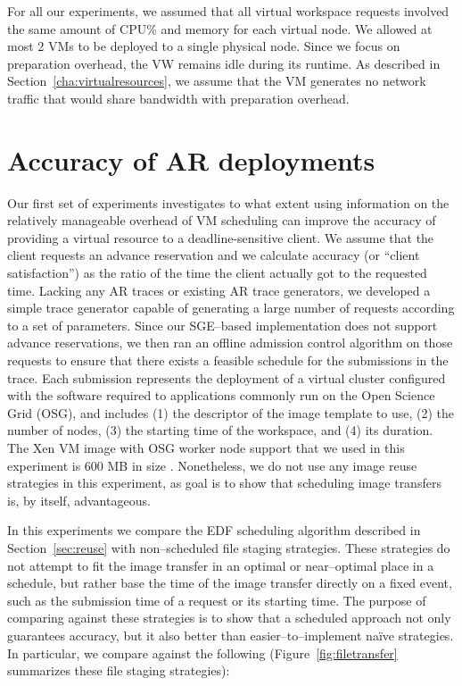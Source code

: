 For all our experiments, we assumed that all virtual workspace requests
involved the same amount of CPU\% and memory for each virtual node. We
allowed at most 2 VMs to be deployed to a single physical node. Since
we focus on preparation overhead, the VW remains idle during its
runtime. As described in Section~\ref{cha:virtualresources}, we assume that the VM generates no network traffic that
would share bandwidth with preparation overhead. 


\section{Accuracy of AR deployments}


Our first set of experiments investigates to what extent using
information on the relatively manageable overhead of VM scheduling can
improve the accuracy of providing a virtual resource to a
deadline{}-sensitive client. We assume that the client requests an advance reservation and we calculate accuracy (or
``client satisfaction'') as the ratio of the time the client actually
got to the requested time. Lacking any AR traces or existing AR trace generators,
we developed a simple trace generator capable of generating a large
number of requests according to a set of parameters. Since our SGE--based implementation does not support advance reservations, we then ran an
offline admission control algorithm on those requests to ensure that there exists a feasible
schedule for the submissions in the trace. Each submission represents
the deployment of a virtual cluster configured with the software
required to applications commonly run on the Open Science Grid (OSG),
and includes (1) the descriptor of the image template to use, (2) the
number of nodes, (3) the starting time of the workspace, and (4) its
duration. The Xen VM image with OSG worker node support that we used in
this experiment is 600 MB in size \cite{DBLP:conf/ccgrid/FosterFKSSZ06}. Nonetheless, we do not use any image reuse strategies in this experiment, as goal is to show that scheduling image transfers is, by itself, advantageous.

In this experiments we compare the EDF scheduling algorithm described in Section~\ref{sec:reuse} with non--scheduled file staging strategies. These strategies do not attempt to fit the image transfer in an optimal or near--optimal place in a schedule, but rather base the time of the image transfer directly on a fixed event, such as the submission time of a request or its starting time. The purpose of comparing against these strategies is to show that a scheduled approach not only guarantees accuracy, but it also better than easier--to--implement na\"ive strategies. In particular, we compare against the following (Figure~\ref{fig:filetransfer} summarizes these file staging strategies):

